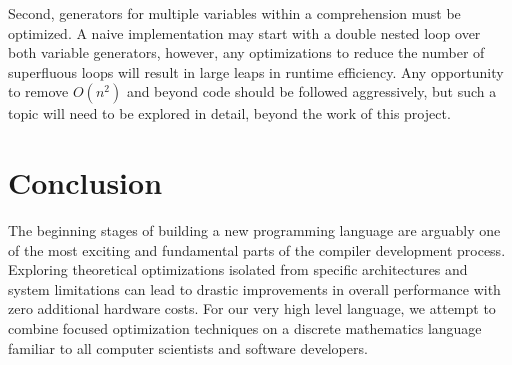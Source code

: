 \documentclass{article}
\begin{document}
Second, generators for multiple variables within a comprehension must be optimized. A naive implementation may start with a double nested loop over both variable generators, however, any optimizations to reduce the number of superfluous loops will result in large leaps in runtime efficiency. Any opportunity to remove $O(n^2)$ and beyond code should be followed aggressively, but such a topic will need to be explored in detail, beyond the work of this project.


\section{Conclusion}
The beginning stages of building a new programming language are arguably one of the most exciting and fundamental parts of the compiler development process. Exploring theoretical optimizations isolated from specific architectures and system limitations can lead to drastic improvements in overall performance with zero additional hardware costs. For our very high level language, we attempt to combine focused optimization techniques on a discrete mathematics language familiar to all computer scientists and software developers.


\pagebreak
\nocite{*} %
\printbibliography %
\end{document}
